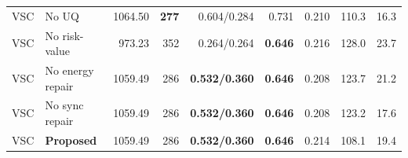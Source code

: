 \begin{table}[H]
\begin{tabular}{@{}llrrrrrrr@{}}
VSC & No UQ & 1064.50 & \textbf{277} & 0.604/0.284 & 0.731 & 0.210 & 110.3 & 16.3 \\
VSC & No risk-value & 973.23 & 352 & 0.264/0.264 & \textbf{0.646} & 0.216 & 128.0 & 23.7 \\
VSC & No energy repair & 1059.49 & 286 & \textbf{0.532/0.360} & \textbf{0.646} & 0.208 & 123.7 & 21.2 \\
VSC & No sync repair & 1059.49 & 286 & \textbf{0.532/0.360} & \textbf{0.646} & 0.208 & 123.2 & 17.6 \\
\rowcolor{gray!10}
VSC & \textbf{Proposed} & 1059.49 & 286 & \textbf{0.532/0.360} & \textbf{0.646} & 0.214 & 108.1 & 19.4 \\
\bottomrule
\end{tabular}
\end{table}
